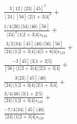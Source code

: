 \documentclass[varwidth, border=5pt]{standalone}
\begin{document}
\begin{my}
$\begin{gathered}
\scriptscriptstyle\frac{3[12]⟨23⟩[45]^2}{[24][56]⟨2|1+3|4]^2}+\\
\scriptscriptstyle\frac{1/4⟨26⟩⟨34⟩⟨46⟩[56]}{⟨24⟩^2⟨1|2+3|4]s_{123}}+\\
\scriptscriptstyle\frac{3/2⟨34⟩[45]⟨46⟩⟨56⟩[56]}{⟨24⟩⟨1|2+3|4]⟨4|5+6|4]s_{123}}+\\
\scriptscriptstyle\frac{-3[45]⟨3|1+2|5]}{[56]⟨1|2+3|4]⟨2|1+3|4]}+\\
\scriptscriptstyle\frac{3⟨23⟩[45]⟨46⟩}{⟨24⟩⟨1|2+3|4]⟨2|1+3|4]}+\\
\scriptscriptstyle\frac{3/4⟨46⟩⟨3|1+2|5]}{⟨24⟩⟨1|2+3|4]s_{123}}+\\
\scriptscriptstyle\frac{-7/4⟨34⟩[45]⟨46⟩}{⟨24⟩⟨1|2+3|4]s_{123}}\phantom{+}
\end{gathered}$
\end{my}
\end{document}
